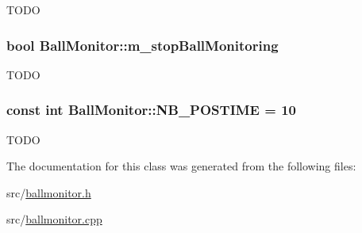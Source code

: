 \label{classBallMonitor_a306a59cfa638a9e4a4c8b6881b5e7f91}
TODO \hypertarget{classBallMonitor_a2486fa4296de6308930dc3864e05b61a}{
\subsubsection[{m\_\-stopBallMonitoring}]{\setlength{\rightskip}{0pt plus 5cm}bool {\bf BallMonitor::m\_\-stopBallMonitoring}}}
\label{classBallMonitor_a2486fa4296de6308930dc3864e05b61a}
TODO \hypertarget{classBallMonitor_a6603291a8d6c6a2de7b378ece54d5e2b}{
\subsubsection[{NB\_\-POSTIME}]{\setlength{\rightskip}{0pt plus 5cm}const int {\bf BallMonitor::NB\_\-POSTIME} = 10}}
\label{classBallMonitor_a6603291a8d6c6a2de7b378ece54d5e2b}
TODO 

The documentation for this class was generated from the following files:\begin{DoxyCompactItemize}
\item 
src/\hyperlink{ballmonitor_8h}{ballmonitor.h}\item 
src/\hyperlink{ballmonitor_8cpp}{ballmonitor.cpp}\end{DoxyCompactItemize}
